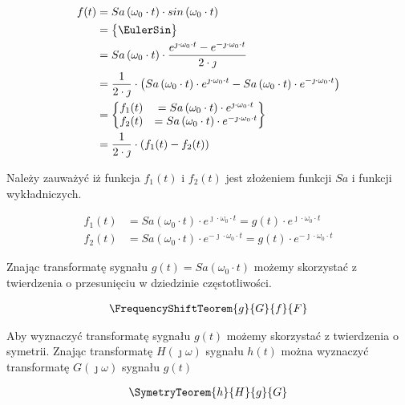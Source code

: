 \begin{task}
\begin{align*}
f(t) &= Sa\left(\omega_0 \cdot t\right) \cdot sin\left(\omega_0 \cdot t\right)\\
&=\begin{Bmatrix}
\EulerSin
\end{Bmatrix}\\
&= Sa\left(\omega_0 \cdot t\right) \cdot \frac{e^{\jmath \cdot \omega_0 \cdot t} - e^{-\jmath \cdot \omega_0 \cdot t}}{2 \cdot \jmath}\\
&= \frac{1}{2 \cdot \jmath} \cdot \left( Sa\left(\omega_0 \cdot t\right) \cdot e^{\jmath \cdot \omega_0 \cdot t} - Sa\left(\omega_0 \cdot t\right) \cdot e^{-\jmath \cdot \omega_0 \cdot t} \right)\\
&=\begin{Bmatrix}
f_1(t) &= Sa\left(\omega_0 \cdot t\right) \cdot e^{\jmath \cdot \omega_0 \cdot t} \\
f_2(t) &= Sa\left(\omega_0 \cdot t\right) \cdot e^{-\jmath \cdot \omega_0 \cdot t}
\end{Bmatrix}\\
&=\frac{1}{2 \cdot \jmath} \cdot \left(f_1(t) - f_2(t) \right)\\
\end{align*}

Należy zauważyć iż funkcja $f_1(t)$ i $f_2(t)$ jest złożeniem funkcji $Sa$ i funkcji wykładniczych.

\begin{align*}
f_1(t) &= Sa\left(\omega_0 \cdot t\right) \cdot e^{\jmath \cdot \omega_0 \cdot t} = g(t)\cdot e^{\jmath \cdot \omega_0 \cdot t}\\
f_2(t) &= Sa\left(\omega_0 \cdot t\right) \cdot e^{-\jmath \cdot \omega_0 \cdot t} = g(t) \cdot e^{-\jmath \cdot \omega_0 \cdot t}
\end{align*}

Znając transformatę sygnału $g(t) = Sa\left(\omega_0 \cdot t\right)$ możemy skorzystać z twierdzenia o przesunięciu w dziedzinie częstotliwości. 

\begin{align*}
\FrequencyShiftTeorem{g}{G}{f}{F}
\end{align*}

Aby wyznaczyć transformatę sygnału $g(t)$ możemy skorzystać z twierdzenia o symetrii. Znając transformatę $H(\jmath \omega)$ sygnału $h(t)$ można wyznaczyć transformatę $G(\jmath \omega)$ sygnału $g(t)$

\begin{align*}
\SymetryTeorem{h}{H}{g}{G}
\end{align*}


\end{task}

